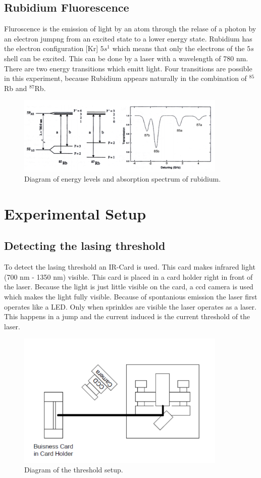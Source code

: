 \subsection{Rubidium Fluorescence}
Fluroscence is the emission of light by an atom through the relase of a photon by an electron jumpng from an excited state to a lower energy state. Rubidium has the electron configuration [Kr] $5s^1$ which means that only the electrons of the $5s$ shell can be excited. This can be done by a laser with a wavelength of 780 nm. There are two energy transitions which emitt light. Four transitions are possible in this experiment, because Rubidium appears naturally in the combination of $^{85}$Rb and $^{87}$Rb.
\begin{figure}[H]
    \centering
    \includegraphics[width=10cm]{content/rubidium_flourescence.png}
    \caption{Diagram of energy levels and absorption spectrum of rubidium.}
\end{figure}
\section{Experimental Setup}
\subsection{Detecting the lasing threshold}
To detect the lasing threshold an IR-Card is used. This card makes infrared light (700 nm - 1350 nm) visible. This card is placed in a card holder right in front of the laser. Because the light is just little visible on the card, a ccd camera is used which makes the light fully visible. Because of spontanious emission the laser first operates like a LED. Only when sprinkles are visible the laser operates as a laser. This happens in a jump and the current induced is the current threshold of the laser.
\begin{figure}[H]
    \centering
    \includegraphics[width=10cm]{content/exp1.png}
    \caption{Diagram of the threshold setup.}
\end{figure}
